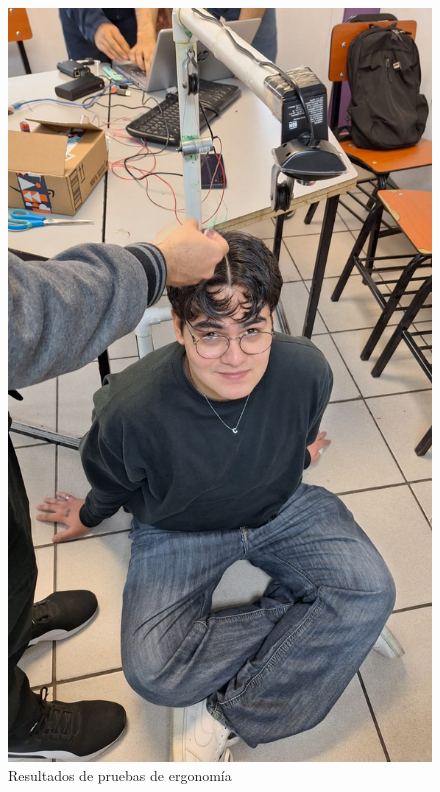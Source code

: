 \begin{figure}[H]
    \centering
    \includegraphics[width=1\textwidth, height=.9\textheight]{img/PruebaErgonomica2.png}
    \caption{Resultados de pruebas de ergonomía}
    \label{fig:ergo-test2}
\end{figure}

